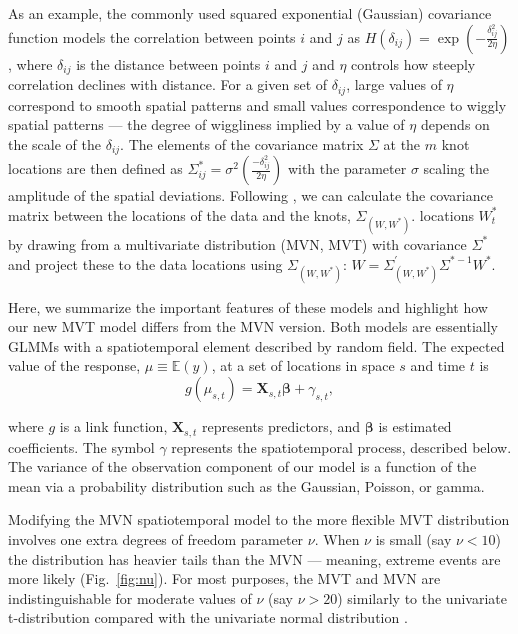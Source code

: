 \documentclass[12pt,english]{article}
\begin{document}
\begin{spacing}{1.9}
As an example, the commonly used squared exponential (Gaussian) covariance function
models the correlation between points $i$ and $j$ as $H(\delta_{ij}) = \exp
\left(-\frac{\delta_{ij}^2}{2 \eta} \right)$, where $\delta_{ij}$ is the
distance between points $i$ and $j$ and $\eta$ controls how steeply
correlation declines with distance. For a given set of $\delta_{ij}$, 
large values of $\eta$ correspond to smooth spatial patterns and small values 
correspondence to wiggly spatial patterns --- the degree of wiggliness implied by 
a value of $\eta$ depends on the scale of the $\delta_{ij}$. The elements of the 
covariance matrix $\Sigma$ at the $m$ knot locations are then
defined as $\Sigma_{ij}^*=\sigma^2 \left( \frac{-\delta_{ij}^2}{2 \eta} \right)$ with the
parameter $\sigma$ scaling the amplitude of the spatial deviations. 
Following \citet{latimer2009}, we can calculate the
covariance matrix between the locations of the data and the knots,
$\Sigma_{\left(W, W^* \right)}$.
locations $W_t^*$ by drawing from a multivariate distribution (MVN, MVT) with covariance
$\Sigma^*$ and project these to the data locations using
$\Sigma_{\left( W,W^{*} \right)}$:
$W=\Sigma_{\left(W,W^* \right)}^{'} \Sigma^{*-1}W^*$.

Here, we summarize the important features of these models and highlight how
our new MVT model differs from the MVN version. Both models are
essentially GLMMs with a spatiotemporal element described by random field.
The expected value of the response, $\mu
\equiv \mathbb{E}(y)$, at a set of locations in space $s$ and time $t$ is
\begin{equation}
  g(\mu_{s,t}) = \bm{X}_{s,t} \bm{\beta} + \gamma_{s,t},
\end{equation}

\noindent where $g$ is a link function,
$\bm{X}_{s,t}$ represents predictors, and $\bm{\beta}$ is estimated coefficients. 
The symbol $\gamma$ represents the spatiotemporal process,
described below. The variance of the observation component of
our model is a function of the mean via a
probability distribution such as the Gaussian, Poisson, or gamma.

Modifying the MVN spatiotemporal model
to the more flexible MVT distribution involves one extra
degrees of freedom parameter $\nu$. When $\nu$ is small (say $\nu < 10$)
the distribution has heavier tails than the MVN --- meaning, extreme events 
are more likely (Fig.~\ref{fig:nu}). For most purposes, the MVT and MVN are
indistinguishable for moderate values of $\nu$ (say $\nu > 20$) similarly to the
univariate t-distribution compared with the univariate normal distribution
\citep[e.g.][]{anderson2017}.


\end{spacing}
\end{document}
